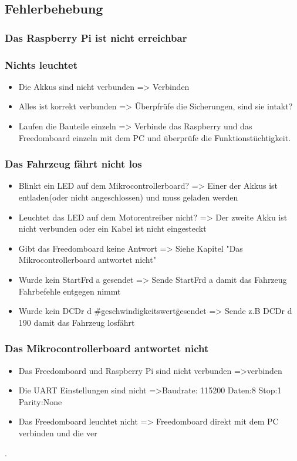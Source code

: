 \subsection{Fehlerbehebung}
\subsubsection{Das Raspberry Pi ist nicht erreichbar}
\subsubsection{Nichts leuchtet}
\begin{itemize}
\item Die Akkus sind nicht verbunden => Verbinden
\item Alles ist korrekt verbunden => Überpfrüfe die Sicherungen, sind sie intakt?
\item Laufen die Bauteile einzeln => Verbinde das Raspberry und das Freedomboard einzeln mit dem PC und überprüfe die Funktionstüchtigkeit.
\end{itemize}

\subsubsection{Das Fahrzeug fährt nicht los}
\begin{itemize}
\item Blinkt ein LED auf dem Mikrocontrollerboard? => Einer der Akkus ist entladen(oder nicht angeschlossen) und muss geladen werden
\item Leuchtet das LED auf dem Motorentreiber nicht? => Der zweite Akku ist nicht verbunden oder ein Kabel ist nicht eingesteckt
\item Gibt das Freedomboard keine Antwort => Siehe Kapitel "Das Mikrocontrollerboard antwortet nicht"
\item Wurde kein StartFrd a gesendet => Sende StartFrd a damit das Fahrzeug Fahrbefehle entgegen nimmt
\item Wurde kein DCDr d \"\#geschwindigkeitswert\" gesendet => Sende z.B DCDr d 190 damit das Fahrzeug losfährt
\end{itemize}

\subsubsection{Das Mikrocontrollerboard antwortet nicht}
\begin{itemize}
\item Das Freedomboard und Raspberry Pi sind nicht verbunden =>verbinden
\item Die UART Einstellungen sind nicht =>Baudrate: 115200 Daten:8 Stop:1 Parity:None
\item Das Freedomboard leuchtet nicht => Freedomboard direkt mit dem PC verbinden und die ver

\end{itemize}
. 
